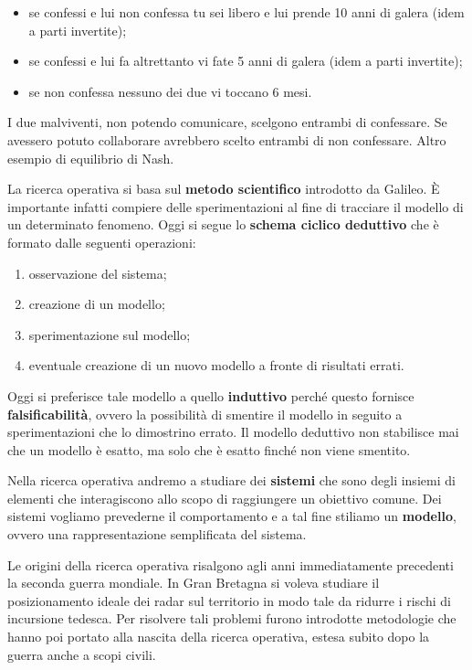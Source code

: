 \documentclass[11pt, oneside]{book}
\begin{document}
\begin{itemize}
\item se confessi e lui non confessa tu sei libero e lui prende 10
  anni di galera (idem a parti invertite);
\item se confessi e lui fa altrettanto vi fate 5 anni di galera (idem
  a parti invertite);
\item se non confessa nessuno dei due vi toccano 6 mesi.
\end{itemize}

I due malviventi, non potendo comunicare, scelgono entrambi di
confessare. Se avessero potuto collaborare avrebbero scelto entrambi
di non confessare. Altro esempio di equilibrio di Nash.

\par\bigskip 

La ricerca operativa si basa sul {\bf metodo scientifico} introdotto
da Galileo. \`E importante infatti compiere delle sperimentazioni al
fine di tracciare il modello di un determinato fenomeno. Oggi si segue
lo {\bf schema ciclico deduttivo} che \`e formato dalle seguenti
operazioni:

\begin{enumerate}
\item osservazione del sistema;
\item creazione di un modello;
\item sperimentazione sul modello;
\item eventuale creazione di un nuovo modello a fronte di risultati
  errati.
\end{enumerate}

Oggi si preferisce tale modello a quello {\bf induttivo} perch\'e
questo fornisce {\bf falsificabilit\`a}, ovvero la possibilit\`a di
smentire il modello in seguito a sperimentazioni che lo dimostrino
errato. Il modello deduttivo non stabilisce mai che un modello \`e
esatto, ma solo che \`e esatto finch\'e non viene smentito.

\par\bigskip

Nella ricerca operativa andremo a studiare dei {\bf sistemi} che sono
degli insiemi di elementi che interagiscono allo scopo di raggiungere
un obiettivo comune. Dei sistemi vogliamo prevederne il comportamento
e a tal fine stiliamo un {\bf modello}, ovvero una rappresentazione
semplificata del sistema.

\par\bigskip

Le origini della ricerca operativa risalgono agli anni immediatamente
precedenti la seconda guerra mondiale. In Gran Bretagna si voleva
studiare il posizionamento ideale dei radar sul territorio in modo
tale da ridurre i rischi di incursione tedesca. Per risolvere tali
problemi furono introdotte metodologie che hanno poi portato alla
nascita della ricerca operativa, estesa subito dopo la guerra anche a
scopi civili.
\end{document}
